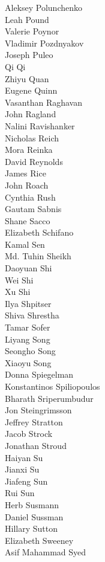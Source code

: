 Aleksey Polunchenko\\
Leah Pound\\
Valerie Poynor\\
Vladimir Pozdnyakov\\
Joseph Puleo\\
Qi Qi\\
Zhiyu Quan\\
Eugene Quinn\\
Vasanthan Raghavan\\
John Ragland\\
Nalini Ravishanker\\
Nicholas Reich\\
Mora Reinka\\
David Reynolds\\
James Rice\\
John Roach\\
Cynthia Rush\\
Gautam Sabnis\\
Shane Sacco\\
Elizabeth Schifano\\
Kamal Sen\\
Md. Tuhin Sheikh\\
Daoyuan Shi\\
Wei Shi\\
Xu Shi\\
Ilya Shpitser\\
Shiva Shrestha\\
Tamar Sofer\\
Liyang Song\\
Seongho Song\\
Xiaoyu Song\\
Donna Spiegelman\\
Konstantinos Spiliopoulos\\
Bharath Sriperumbudur\\
Jon Steingrimsson\\
Jeffrey Stratton\\
Jacob Strock\\
Jonathan Stroud\\
Haiyan Su\\
Jianxi Su\\
Jiafeng Sun\\
Rui Sun\\
Herb Susmann\\
Daniel Sussman\\
Hillary Sutton\\
Elizabeth Sweeney\\
Asif Mahammad Syed\\
